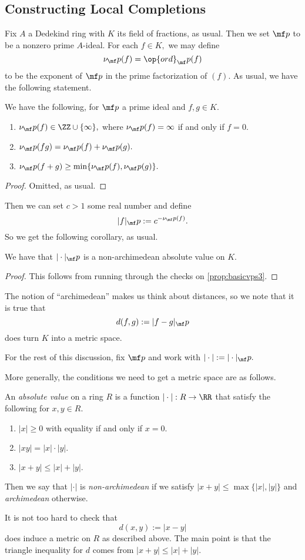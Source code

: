 \subsection{Constructing Local Completions}
Fix $A$ a Dedekind ring with $K$ its field of fractions, as usual. Then we set $\mf p$ to be a nonzero prime $A$-ideal. For each $f\in K,$ we may define
\[\nu_\mf p(f)=\op{ord}_\mf p(f)\]
to be the exponent of $\mf p$ in the prime factorization of $(f).$ As usual, we have the following statement.
\begin{proposition} \label{prop:basicvps3}
	We have the following, for $\mf p$ a prime ideal and $f,g\in K.$
	\begin{enumerate}[label=(\alph*)]
		\item $\nu_\mf p(f)\in\ZZ\cup\{\infty\},$ where $\nu_\mf p(f)=\infty$ if and only if $f=0.$
		\item $\nu_\mf p(fg)=\nu_\mf p(f)+\nu_\mf p(g).$
		\item $\nu_\mf p(f+g)\ge\min\{\nu_\mf p(f),\nu_\mf p(g)\}.$
	\end{enumerate}
\end{proposition}
\begin{proof}
	Omitted, as usual.
\end{proof}
Then we can set $c>1$ some real number and define
\[|f|_\mf p:=c^{-\nu_\mf p(f)}.\]
So we get the following corollary, as usual.
\begin{corollary}
	We have that $|\cdot|_\mf p$ is a non-archimedean absolute value on $K.$
\end{corollary}
\begin{proof}
	This follows from running through the checks on \autoref{prop:basicvps3}.
\end{proof}
The notion of ``archimedean'' makes us think about distances, so we note that it is true that
\[d(f,g):=|f-g|_\mf p\]
does turn $K$ into a metric space.
\begin{warn}
	For the rest of this discussion, fix $\mf p$ and work with $|\cdot|:=|\cdot|_\mf p.$
\end{warn}
More generally, the conditions we need to get a metric space are as follows.
\begin{definition}
	An \textit{absolute value} on a ring $R$ is a function $|\cdot|:R\to\RR$ that satisfy the following for $x,y\in R.$
	\begin{enumerate}[label=(\alph*)]
		\item $|x|\ge0$ with equality if and only if $x=0.$
		\item $|xy|=|x|\cdot|y|.$
		\item $|x+y|\le|x|+|y|.$
	\end{enumerate}
	Then we say that $|\cdot|$ is \textit{non-archimedean} if we satisfy $|x+y|\le\max\{|x|,|y|\}$ and \textit{archimedean} otherwise.
\end{definition}
It is not too hard to check that
\[d(x,y):=|x-y|\]
does induce a metric on $R$ as described above. The main point is that the triangle inequality for $d$ comes from $|x+y|\le|x|+|y|.$

